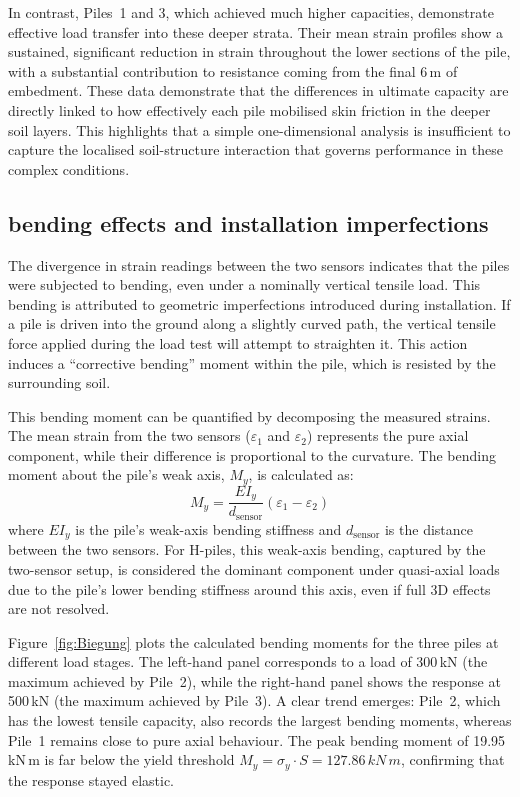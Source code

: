 {{{{{{In contrast, Piles~1 and 3, which achieved much higher capacities, demonstrate effective load transfer into these deeper strata. Their mean strain profiles show a sustained, significant reduction in strain throughout the lower sections of the pile, with a substantial contribution to resistance coming from the final 6\,m of embedment. These data demonstrate that the differences in ultimate capacity are directly linked to how effectively each pile mobilised skin friction in the deeper soil layers. This highlights that a simple one-dimensional analysis is insufficient to capture the localised soil-structure interaction that governs performance in these complex conditions.



\subsection{bending effects and installation imperfections}
\label{subsec:bending_effects}

The divergence in strain readings between the two sensors indicates that the piles were subjected to bending, even under a nominally vertical tensile load. This bending is attributed to geometric imperfections introduced during installation. If a pile is driven into the ground along a slightly curved path, the vertical tensile force applied during the load test will attempt to straighten it. This action induces a ``corrective bending'' moment within the pile, which is resisted by the surrounding soil.

This bending moment can be quantified by decomposing the measured strains. The mean strain from the two sensors ($\varepsilon_1$ and $\varepsilon_2$) represents the pure axial component, while their difference is proportional to the curvature. The bending moment about the pile's weak axis, $M_y$, is calculated as:
\begin{equation}
	M_y = \frac{EI_y}{d_{\text{sensor}}} (\varepsilon_1 - \varepsilon_2)
\end{equation}
where $EI_y$ is the pile's weak-axis bending stiffness and $d_{\text{sensor}}$ is the distance between the two sensors. For H-piles, this weak-axis bending, captured by
the two-sensor setup, is considered the dominant component under quasi-axial loads due to the pile's lower bending stiffness around this axis, even if full 3D effects are not resolved.

Figure~\ref{fig:Biegung} plots the calculated bending moments for the three piles at different load stages.
The left-hand panel corresponds to a load of 300\,kN (the maximum achieved by Pile~2), while the right-hand panel shows the response at 500\,kN (the maximum achieved by Pile~3). A clear trend emerges: Pile~2, which has the lowest tensile capacity, also records the largest bending moments, whereas Pile~1 remains close to pure axial behaviour. The peak bending moment of 19.95\,kN\,m is far below the yield threshold $M_y = \sigma_y \cdot S = 127.86\,kN\,m$, confirming that the response stayed elastic.


}}}}}}
